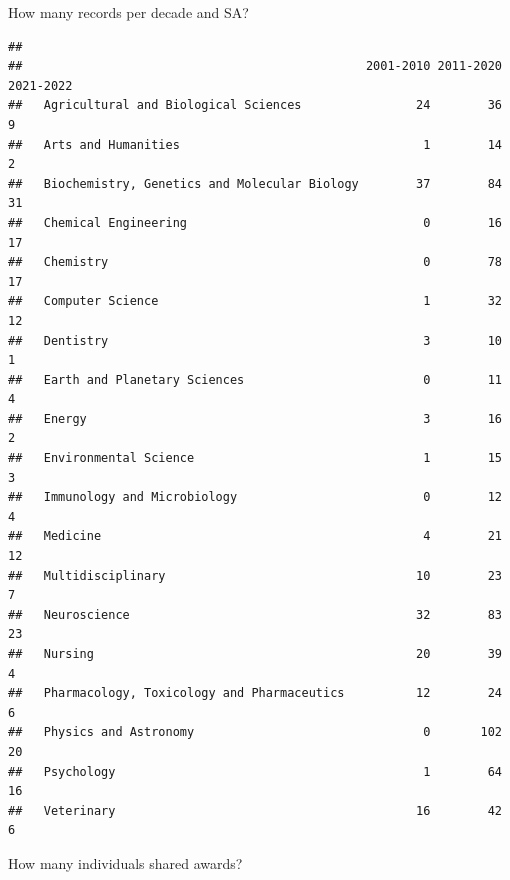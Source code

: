 \documentclass[
]{article}
\newenvironment{Shaded}{\begin{snugshade}}{\end{snugshade}}
\newcommand{\AttributeTok}[1]{\textcolor[rgb]{0.77,0.63,0.00}{#1}}
\newcommand{\CommentTok}[1]{\textcolor[rgb]{0.56,0.35,0.01}{\textit{#1}}}
\newcommand{\FunctionTok}[1]{\textcolor[rgb]{0.00,0.00,0.00}{#1}}
\newcommand{\NormalTok}[1]{#1}
\newcommand{\SpecialCharTok}[1]{\textcolor[rgb]{0.00,0.00,0.00}{#1}}
\newcommand{\StringTok}[1]{\textcolor[rgb]{0.31,0.60,0.02}{#1}}
\begin{document}
How many records per decade and SA?

\begin{Shaded}
\end{Shaded}

\begin{verbatim}
##                                               
##                                                2001-2010 2011-2020 2021-2022
##   Agricultural and Biological Sciences                24        36         9
##   Arts and Humanities                                  1        14         2
##   Biochemistry, Genetics and Molecular Biology        37        84        31
##   Chemical Engineering                                 0        16        17
##   Chemistry                                            0        78        17
##   Computer Science                                     1        32        12
##   Dentistry                                            3        10         1
##   Earth and Planetary Sciences                         0        11         4
##   Energy                                               3        16         2
##   Environmental Science                                1        15         3
##   Immunology and Microbiology                          0        12         4
##   Medicine                                             4        21        12
##   Multidisciplinary                                   10        23         7
##   Neuroscience                                        32        83        23
##   Nursing                                             20        39         4
##   Pharmacology, Toxicology and Pharmaceutics          12        24         6
##   Physics and Astronomy                                0       102        20
##   Psychology                                           1        64        16
##   Veterinary                                          16        42         6
\end{verbatim}

How many individuals shared awards?

\begin{Shaded}
\end{Shaded}
\end{document}
